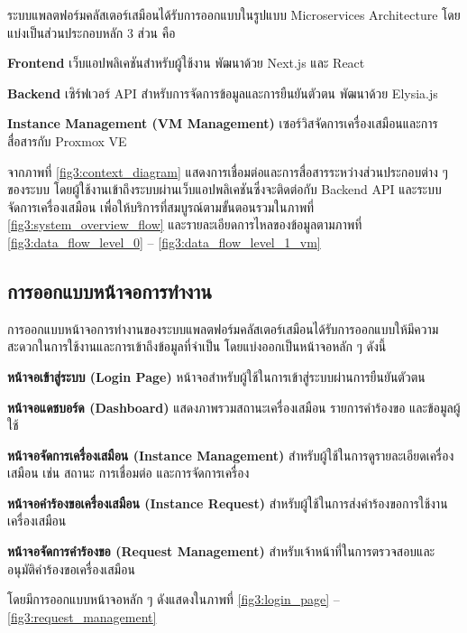 \hspace*{1.5em} %
ระบบแพลตฟอร์มคลัสเตอร์เสมือนได้รับการออกแบบในรูปแบบ Microservices Architecture โดยแบ่งเป็นส่วนประกอบหลัก 3 ส่วน คือ
\begin{mycustomitem}
    \item \textbf{Frontend} เว็บแอปพลิเคชันสำหรับผู้ใช้งาน พัฒนาด้วย Next.js และ React
    \item \textbf{Backend} เซิร์ฟเวอร์ API สำหรับการจัดการข้อมูลและการยืนยันตัวตน พัฒนาด้วย Elysia.js
    \item \textbf{Instance Management (VM Management)} เซอร์วิสจัดการเครื่องเสมือนและการสื่อสารกับ Proxmox VE
\end{mycustomitem}

\hspace*{1.5em} %
จากภาพที่ \ref{fig3:context_diagram} แสดงการเชื่อมต่อและการสื่อสารระหว่างส่วนประกอบต่าง ๆ ของระบบ โดยผู้ใช้งานเข้าถึงระบบผ่านเว็บแอปพลิเคชันซึ่งจะติดต่อกับ Backend API และระบบจัดการเครื่องเสมือน เพื่อให้บริการที่สมบูรณ์ตามขั้นตอนรวมในภาพที่ \ref{fig3:system_overview_flow} และรายละเอียดการไหลของข้อมูลตามภาพที่ \ref{fig3:data_flow_level_0} – \ref{fig3:data_flow_level_1_vm} 

\newpage
\subsection{การออกแบบหน้าจอการทำงาน}
\hspace*{1.5em} %
การออกแบบหน้าจอการทำงานของระบบแพลตฟอร์มคลัสเตอร์เสมือนได้รับการออกแบบให้มีความสะดวกในการใช้งานและการเข้าถึงข้อมูลที่จำเป็น โดยแบ่งออกเป็นหน้าจอหลัก ๆ ดังนี้
\begin{mycustomitem}
    \item \textbf{หน้าจอเข้าสู่ระบบ (Login Page)} หน้าจอสำหรับผู้ใช้ในการเข้าสู่ระบบผ่านการยืนยันตัวตน
    \item \textbf{หน้าจอแดชบอร์ด (Dashboard)} แสดงภาพรวมสถานะเครื่องเสมือน รายการคำร้องขอ และข้อมูลผู้ใช้
    \item \textbf{หน้าจอจัดการเครื่องเสมือน (Instance Management)} สำหรับผู้ใช้ในการดูรายละเอียดเครื่องเสมือน เช่น สถานะ การเชื่อมต่อ และการจัดการเครื่อง
    \item \textbf{หน้าจอคำร้องขอเครื่องเสมือน (Instance Request)} สำหรับผู้ใช้ในการส่งคำร้องขอการใช้งานเครื่องเสมือน
    \item \textbf{หน้าจอจัดการคำร้องขอ (Request Management)} สำหรับเจ้าหน้าที่ในการตรวจสอบและอนุมัติคำร้องขอเครื่องเสมือน
\end{mycustomitem}
โดยมีการออกแบบหน้าจอหลัก ๆ ดังแสดงในภาพที่ \ref{fig3:login_page} – \ref{fig3:request_management}

